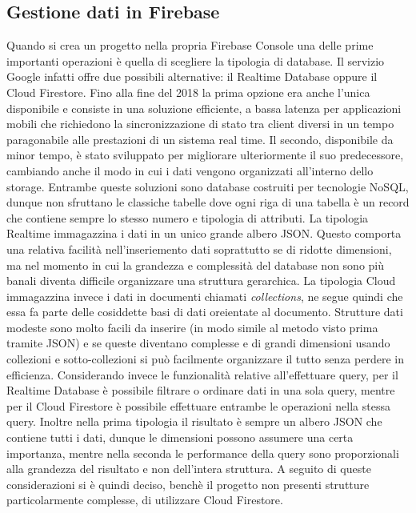 \subsection{Gestione dati in Firebase}
Quando si crea un progetto nella propria Firebase Console una delle prime
importanti operazioni è quella di scegliere la tipologia di database. Il
servizio Google infatti offre due possibili alternative: il Realtime Database
oppure il Cloud Firestore. Fino alla fine del 2018 la prima opzione era anche
l'unica disponibile e consiste in una soluzione efficiente, a bassa latenza per
applicazioni mobili che richiedono la sincronizzazione di stato tra client
diversi in un tempo paragonabile alle prestazioni di un sistema real time. Il
secondo, disponibile da minor tempo, è stato sviluppato per migliorare
ulteriormente il suo predecessore, cambiando anche il modo in cui i dati vengono
organizzati all'interno dello storage. Entrambe queste soluzioni sono database
costruiti per tecnologie NoSQL, dunque non sfruttano le classiche tabelle dove
ogni riga di una tabella è un record che contiene sempre lo stesso numero e
tipologia di attributi. La tipologia Realtime immagazzina i dati in un unico
grande albero JSON. Questo comporta una relativa facilità nell'inseriemento dati
soprattutto se di ridotte dimensioni, ma nel momento in cui la grandezza e
complessità del database non sono più banali diventa difficile organizzare una
struttura gerarchica. La tipologia Cloud immagazzina invece i dati in documenti
chiamati \textit{collections}, ne segue quindi che essa fa parte delle cosiddette
basi di dati oreientate al documento. Strutture dati modeste sono molto facili
da inserire (in modo simile al metodo visto prima tramite JSON) e se queste
diventano complesse e di grandi dimensioni usando collezioni e sotto-collezioni si
può facilmente organizzare il tutto senza perdere in efficienza. Considerando
invece le funzionalità relative all'effettuare query, per il Realtime Database è
possibile filtrare o ordinare dati in una sola query, mentre per il Cloud
Firestore è possibile effettuare entrambe le operazioni nella stessa query.
Inoltre nella prima tipologia il risultato è sempre un albero JSON che contiene
tutti i dati, dunque le dimensioni possono assumere una certa importanza, mentre
nella seconda le performance della query sono proporzionali alla grandezza del
risultato e non dell'intera struttura. A seguito di queste considerazioni si è
quindi deciso, benchè il progetto non presenti strutture particolarmente
complesse, di utilizzare Cloud Firestore. 

